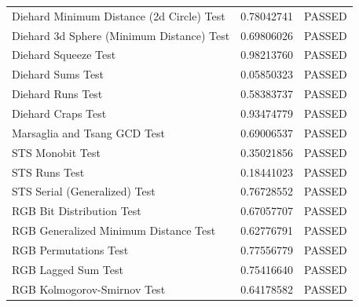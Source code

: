 \begin{table}[H]
\begin{center}
\begin{tabular}{|l |c |c |}
			\\[0.005ex]
			Diehard Minimum Distance (2d Circle) Test                   &
			0.78042741                                                  & PASSED
			\\[0.005ex]
			Diehard 3d Sphere (Minimum Distance) Test                   &
			0.69806026                                                  & PASSED
			\\[0.005ex]
			Diehard Squeeze Test                                        &
			0.98213760                                                  & PASSED
			\\[0.005ex]
			Diehard Sums Test                                           &
			0.05850323                                                  & PASSED
			\\ [0.005ex] Diehard Runs Test & 0.58383737 & PASSED \\ [0.005ex]
			Diehard Craps Test                                          & 0.93474779 & PASSED \\  [0.005ex] Marsaglia and
			Tsang GCD Test                                              & 0.69006537 & PASSED \\    [0.005ex] STS Monobit
			Test                                                        & 0.35021856 & PASSED \\ [0.005ex] STS Runs Test & 0.18441023 &
			PASSED                                                                            \\[0.005ex]
			STS Serial (Generalized) Test                               &
			0.76728552                                                  & PASSED
			\\[0.005ex]
			RGB Bit Distribution Test                                   &
			0.67057707                                                  & PASSED
			\\[0.005ex]
			RGB Generalized Minimum Distance Test                       &
			0.62776791                                                  & PASSED
			\\[0.005ex]
			RGB Permutations Test                                       &
			0.77556779                                                  & PASSED
			\\[0.005ex]
			RGB Lagged Sum Test                                         &
			0.75416640                                                  & PASSED
			\\[0.005ex]
			RGB Kolmogorov-Smirnov Test                                 &
			0.64178582                                                  & PASSED

\end{tabular}
\end{center}
\end{table}
